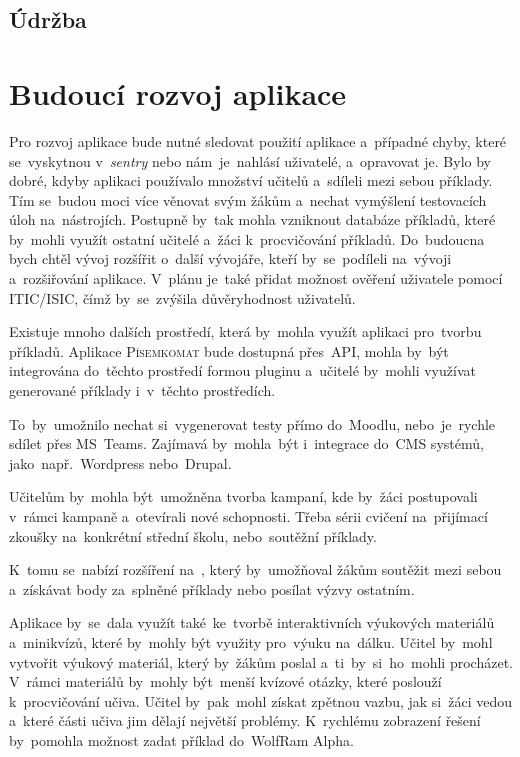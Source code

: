 \documentclass[14pt,a4paper]{article}
\begin{document}
        \subsection{Údržba}
        
	\section{Budoucí rozvoj aplikace}
        Pro rozvoj aplikace bude nutné sledovat použití aplikace a~případné chyby, které se~vyskytnou v~\emph{sentry} nebo nám~je~nahlásí uživatelé, a~opravovat je.
        Bylo by dobré, kdyby aplikaci používalo množství učitelů a~sdíleli mezi sebou příklady. Tím se~budou moci více věnovat svým žákům a~nechat vymýšlení testovacích úloh na~nástrojích. Postupně by~tak mohla vzniknout databáze příkladů, které by~mohli využít ostatní učitelé a~žáci k~procvičování příkladů.
        Do~budoucna bych chtěl vývoj rozšířit o~další vývojáře, kteří by~se~podíleli na~vývoji a~rozšiřování aplikace. V~plánu je~také přidat možnost ověření uživatele pomocí ITIC/ISIC, čímž by~se~zvýšila důvěryhodnost uživatelů.
        
        Existuje mnoho dalších prostředí, která by~mohla využít aplikaci pro~tvorbu příkladů. Aplikace \textsc{Písemkomat} bude dostupná přes~\textsc{API}, mohla by~být integrována do~těchto prostředí formou pluginu a~učitelé by~mohli využívat generované příklady i~v~těchto prostředích.
        
        To~by~umožnilo nechat si~vygenerovat testy přímo do~Moodlu, nebo~je~rychle sdílet přes MS~Teams. Zajímavá by~mohla~být i~integrace do~\textsc{CMS} systémů, jako~např.~Wordpress nebo~Drupal.

        Učitelům by~mohla být~umožněna tvorba kampaní, kde by~žáci postupovali v~rámci kampaně a~otevírali nové schopnosti. Třeba sérii cvičení na~přijímací zkoušky na~konkrétní střední školu, nebo~soutěžní příklady.
        
        K~tomu se~nabízí rozšíření na~, který by~umožňoval žákům soutěžit mezi sebou a~získávat body za~splněné příklady nebo posílat výzvy ostatním.

        Aplikace by~se~dala využít také~ke~tvorbě interaktivních výukových materiálů a~minikvízů, které by~mohly být využity pro~výuku na~dálku. Učitel by~mohl vytvořit výukový materiál, který by~žákům poslal a~ti~by~si~ho~mohli procházet. V~rámci materiálů by~mohly být~menší kvízové otázky, které poslouží k~procvičování učiva. Učitel by~pak~mohl získat zpětnou vazbu, jak si~žáci vedou a~které části učiva jim dělají největší problémy. K~rychlému zobrazení řešení by~pomohla možnost zadat příklad do~WolfRam Alpha. 
        
\end{document}
